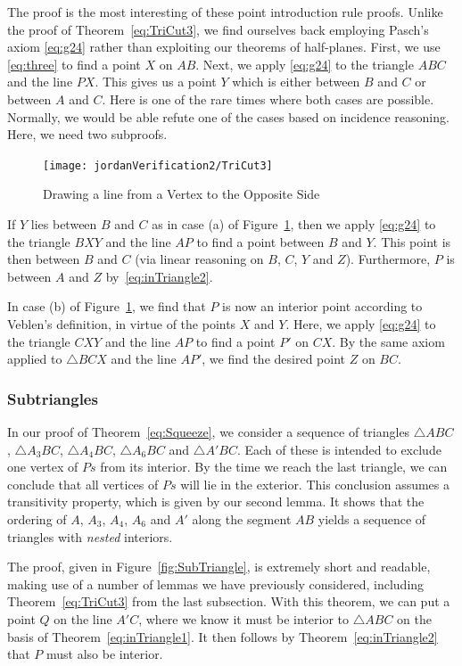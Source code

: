 The proof is the most interesting of these point introduction rule proofs. Unlike the proof of Theorem~\ref{eq:TriCut3}, we find ourselves back employing Pasch's axiom \eqref{eq:g24} rather than exploiting our theorems of half-planes. First, we use \ref{eq:three} to find a point $X$ on $AB$. Next, we apply \eqref{eq:g24} to the triangle $ABC$ and the line $PX$. This gives us a point $Y$ which is either between $B$ and $C$ or between $A$ and $C$. Here is one of the rare times where both cases are possible. Normally, we would be able refute one of the cases based on incidence reasoning. Here, we need two subproofs.

\begin{figure}
\centering\texttt{[image: jordanVerification2/TriCut3]}
\caption{Drawing a line from a Vertex to the Opposite Side}
\label{fig:TriCut3}
\end{figure}

If $Y$ lies between $B$ and $C$ as in case (a) of Figure~\ref{fig:TriCut3}, then we apply \eqref{eq:g24} to the triangle $BXY$ and the line $AP$ to find a point between $B$ and $Y$. This point is then between $B$ and $C$ (via linear reasoning on $B$, $C$, $Y$ and $Z$). Furthermore, $P$ is between $A$ and $Z$ by~\eqref{eq:inTriangle2}.

In case (b) of Figure~\ref{fig:TriCut3}, we find that $P$ is now an interior point according to Veblen's definition, in virtue of the points $X$ and $Y$. Here, we apply \eqref{eq:g24} to the triangle $CXY$ and the line $AP$ to find a point $P'$ on $CX$. By the same axiom applied to $\triangle BCX$ and the line $AP'$, we find the desired point $Z$ on $BC$.

\subsubsection{Subtriangles}
In our proof of Theorem~\ref{eq:Squeeze}, we consider a sequence of triangles $\triangle ABC$, $\triangle A_3BC$, $\triangle A_4BC$, $\triangle A_6BC$ and $\triangle A'BC$. Each of these is intended to exclude one vertex of $Ps$ from its interior. By the time we reach the last triangle, we can conclude that all vertices of $Ps$ will lie in the exterior. This conclusion assumes a transitivity property, which is given by our second lemma. It shows that the ordering of $A$, $A_3$, $A_4$, $A_6$ and $A'$ along the segment $AB$ yields a sequence of triangles with \emph{nested} interiors. 

The proof, given in Figure~\ref{fig:SubTriangle}, is extremely short and readable, making use of a number of lemmas we have previously considered, including Theorem~\ref{eq:TriCut3} from the last subsection. With this theorem, we can put a point $Q$ on the line $A'C$, where we know it must be interior to $\triangle ABC$ on the basis of Theorem~\ref{eq:inTriangle1}. It then follows by Theorem~\ref{eq:inTriangle2} that $P$ must also be interior.

